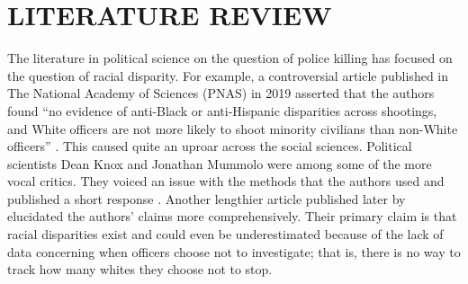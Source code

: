 \documentclass[12pt]{article}
\begin{document}



\section{LITERATURE REVIEW}

The literature in political science on the question of police killing has focused on the question of racial disparity. For example, a controversial article published in The National Academy of Sciences (PNAS) in 2019 asserted that the authors found “no evidence of anti-Black or anti-Hispanic disparities across shootings, and White officers are not more likely to shoot minority civilians than non-White officers” \parencite[15877]{johnsonOfficerCharacteristicsRacial2019}. This caused quite an uproar across the social sciences. Political scientists Dean Knox and Jonathan Mummolo were among some of the more vocal critics. They voiced an issue with the methods that the authors used and published a short response \parencite{knoxMakingInferencesRacial2020}. Another lengthier article published later by \textcite{knoxAdministrativeRecordsMask2020} elucidated the authors’ claims more comprehensively. Their primary claim is that racial disparities exist and could even be underestimated because of the lack of data concerning when officers choose not to investigate; that is, there is no way to track how many whites they choose not to stop.
\end{document}
